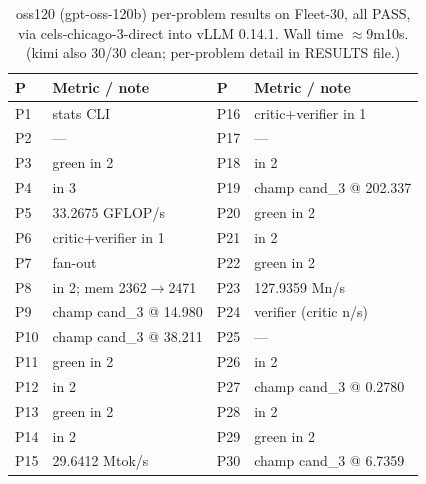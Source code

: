 \begin{table}[t]
  \centering
  \caption{oss120 (gpt-oss-120b) per-problem results on Fleet-30, all PASS,
    via cels-chicago-3-direct into vLLM 0.14.1. Wall time $\approx$9m10s.
    (kimi also 30/30 clean; per-problem detail in RESULTS file.)}
  \label{tab:oss120detail}
  \begin{tabular}{llll}
    \toprule
    P & Metric / note & P & Metric / note \\
    \midrule
    P1  & stats CLI               & P16 & critic+verifier in 1 \\
    P2  & ---                     & P17 & --- \\
    P3  & green in 2              & P18 & in 2 \\
    P4  & in 3                    & P19 & champ cand\_3 @ 202.337 \\
    P5  & 33.2675 GFLOP/s         & P20 & green in 2 \\
    P6  & critic+verifier in 1    & P21 & in 2 \\
    P7  & fan-out                 & P22 & green in 2 \\
    P8  & in 2; mem 2362$\to$2471 & P23 & 127.9359 Mn/s \\
    P9  & champ cand\_3 @ 14.980  & P24 & verifier (critic n/s) \\
    P10 & champ cand\_3 @ 38.211  & P25 & --- \\
    P11 & green in 2              & P26 & in 2 \\
    P12 & in 2                    & P27 & champ cand\_3 @ 0.2780 \\
    P13 & green in 2              & P28 & in 2 \\
    P14 & in 2                    & P29 & green in 2 \\
    P15 & 29.6412 Mtok/s          & P30 & champ cand\_3 @ 6.7359 \\
    \bottomrule
  \end{tabular}
\end{table}

